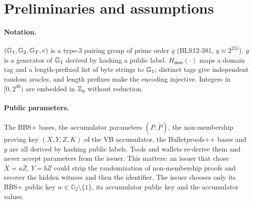 \section{Preliminaries and assumptions}\label{s:prelim}
\paragraph{Notation.} $(\mathbb{G}_1,\mathbb{G}_2,\mathbb{G}_T,e)$ is a type-3 pairing group of prime order $q$ (BLS12-381, $q\approx 2^{255}$). $g$ is a generator of $\mathbb{G}_1$ derived by hashing a public label. $H_{\mathsf{dom}}(\cdot)$ maps a domain tag and a length-prefixed list of byte strings to $\mathbb{G}_1$; distinct tags give independent random oracles, and length prefixes make the encoding injective. Integers in $[0,2^{40})$ are embedded in $\mathbb{Z}_q$ without reduction.

\paragraph{Public parameters.} The BBS+ bases, the accumulator parameters $(P,\tilde P)$, the non-membership proving key $(X,Y,Z,K)$ of the VB accumulator, the Bulletproofs++ bases and $g$ are all derived by hashing public labels. Tools and wallets re-derive them and never accept parameters from the issuer. This matters: an issuer that chose $X=aZ$, $Y=bZ$ could strip the randomization of non-membership proofs and recover the hidden witness and then the identifier. The issuer chooses only its BBS+ public key $w\in\mathbb{G}_2\setminus\{1\}$, its accumulator public key and the accumulator values.

